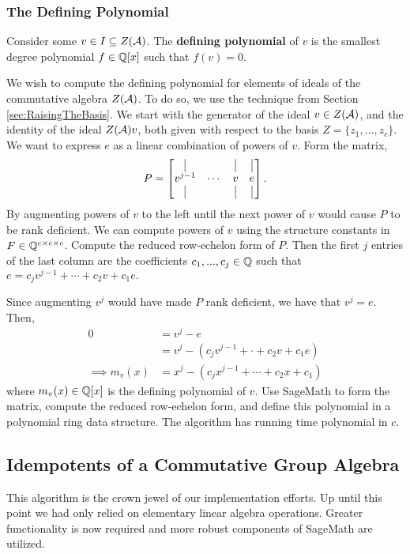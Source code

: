 \documentclass[../thesis.tex]{subfiles}
\begin{document}
\subsubsection{The Defining Polynomial}
Consider some $v\in I\subseteq Z(\mathcal{A})$. The \textbf{defining polynomial} of $v$ is the smallest degree polynomial $f\in\mathbb{Q}[x]$ such that $f(v) = 0.$

We wish to compute the defining polynomial for elements of ideals of the commutative algebra $Z(\mathcal{A})$. To do so, we use the technique from Section \ref{sec:RaisingTheBasis}. We start with the generator of the ideal $v\in Z(\mathcal{A})$, and the identity of the ideal $Z(\mathcal{A})v$, both given with respect to the basis $Z=\{z_1,...,z_c\}.$ We want to express $e$ as a linear combination of powers of $v.$ Form the matrix,
\begin{equation*}
    P = \begin{bmatrix}
        \vline & & \vline & \vline\\
        v^{j-1} & \cdots & v& e\\
        \vline & & \vline & \vline
        \end{bmatrix}.    
\end{equation*}
By augmenting powers of $v$ to the left until the next power of $v$ would cause $P$ to be rank deficient. We can compute powers of $v$ using the structure constants in $F\in\mathbb{Q}^{c\times c\times c}$. Compute the reduced row-echelon form of $P.$ Then the first $j$ entries of the last column are the coefficients $c_1,...,c_j\in\mathbb{Q}$ such that $e = c_jv^{j-1} +\cdots+ c_2v + c_1e.$

Since augmenting $v^j$ would have made $P$ rank deficient, we have that $v^j = e.$ Then,
\begin{align*}
    0 &= v^j - e\\
        &= v^j - (c_jv^{j-1} +\cdot + c_2v + c_1e)\\
    \implies m_v(x) &= x^j - (c_jx^{j-1} + \cdots + c_2x + c_1)
\end{align*}
where $m_v(x)\in\mathbb{Q}[x]$ is the defining polynomial of $v.$ Use SageMath to form the matrix, compute the reduced row-echelon form, and define this polynomial in a polynomial ring data structure. The algorithm has running time polynomial in $c.$

\subsection{Idempotents of a Commutative Group Algebra}\label{sec:split}
This algorithm is the crown jewel of our implementation efforts. Up until this point we had only relied on elementary linear algebra operations. Greater functionality is now required and more robust components of SageMath are utilized.
\end{document}
